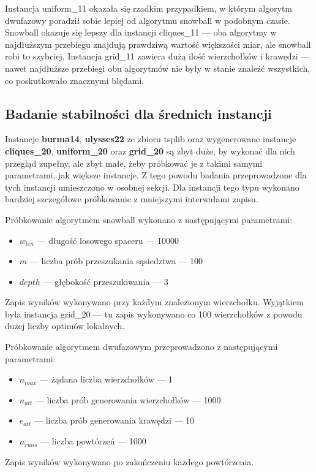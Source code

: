 Instancja uniform\_11 okazała się rzadkim przypadkiem, w którym algorytm dwufazowy poradził sobie lepiej od algorytmu snowball w podobnym czasie.
Snowball okazuje się lepszy dla instancji cliques\_11 --- oba algorytmy w najdłuższym przebiegu znajdują prawdziwą wartość większości miar, ale snowball robi to szybciej.
Instancja grid\_11 zawiera dużą ilość wierzchołków i krawędzi --- nawet najdłuższe przebiegi obu algorytmów nie były w stanie znaleźć wszystkich,
co poskutkowało znacznymi błędami.

\subsection{Badanie stabilności dla średnich instancji}
Instancje \textbf{burma14}, \textbf{ulysses22} ze zbioru tsplib oraz wygenerowane instancje
\textbf{cliques\_20}, \textbf{uniform\_20} oraz \textbf{grid\_20} są zbyt duże, by wykonać dla nich przegląd zupełny,
ale zbyt małe, żeby próbkować je z takimi samymi parametrami, jak większe instancje.
Z tego powodu badania przeprowadzone dla tych instancji umieszczono w osobnej sekcji.
Dla instancji tego typu wykonano bardziej szczegółowe próbkowanie z mniejszymi interwałami zapisu.

Próbkowanie algorytmem snowball wykonano z następującymi parametrami:
\begin{itemize}
    \item $w_{len}$ --- długość losowego spaceru --- 10000
    \item $m$ --- liczba prób przeszukania sąsiedztwa --- 100
    \item $depth$ --- głębokość przeszukiwania --- 3
\end{itemize}
Zapis wyników wykonywano przy każdym znalezionym wierzchołku.
Wyjątkiem była instancja grid\_20 --- tu zapis wykonywano co 100 wierzchołków z powodu dużej liczby optimów lokalnych.

Próbkowanie algorytmem dwufazowym przeprowadzono z następującymi parametrami:
\begin{itemize}
    \item $n_{max}$ --- żądana liczba wierzchołków --- 1
    \item $n_{att}$ --- liczba prób generowania wierzchołków --- 1000
    \item $e_{att}$ --- liczba prób generowania krawędzi --- 10
    \item $n_{runs}$ --- liczba powtórzeń --- 1000
\end{itemize}
Zapis wyników wykonywano po zakończeniu każdego powtórzenia.

